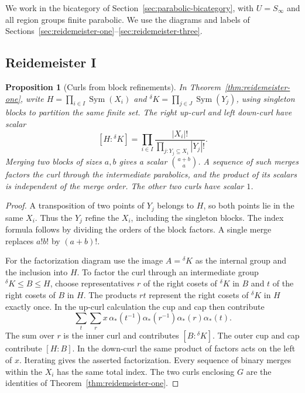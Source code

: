 \documentclass[11pt,a4paper]{article}
\numberwithin{equation}{section}
\newtheorem{proposition}[theorem]{Proposition}
\theoremstyle{definition}
\newcommand{\cg}[2]{{}^{#1}\!#2}
\begin{document}
We work in the bicategory of Section~\ref{sec:parabolic-bicategory},
with \(U=S_\infty\) and all region groups finite parabolic. We use the
diagrams and labels of
Sections~\ref{sec:reidemeister-one}--\ref{sec:reidemeister-three}.

\subsection{Reidemeister I}

\begin{proposition}[Curls from block refinements]\label{prop:parabolic-curls}
In Theorem~\ref{thm:reidemeister-one}, write
\(H=\prod_{i\in I}\operatorname{Sym}(X_i)\) and
\(\cg{\delta}{K}=\prod_{j\in J}\operatorname{Sym}(Y_j)\), using
singleton blocks to partition the same finite set. The right up-curl
and left down-curl have scalar
\[
 [H:\cg{\delta}{K}]
 =\prod_{i\in I}\frac{|X_i|!}{\prod_{j:Y_j\subseteq X_i}|Y_j|!}.
\]
Merging two blocks of sizes \(a,b\) gives a scalar
\(\binom{a+b}{a}\). A sequence of such merges factors the curl through
the intermediate parabolics, and the product of its scalars is
independent of the merge order. The other two curls have scalar \(1\).
\end{proposition}

\begin{proof}
A transposition of two points of \(Y_j\) belongs to \(H\), so both
points lie in the same \(X_i\). Thus the \(Y_j\) refine the \(X_i\),
including the singleton blocks.
The index formula follows by dividing the orders of the block
factors. A single merge replaces \(a!b!\) by \((a+b)!\).

For the factorization diagram use the image \(A=\cg{\delta}{K}\)
as the internal group and the inclusion into \(H\).
To factor the curl through an intermediate group
\(\cg{\delta}{K}\le B\le H\), choose representatives \(r\) of the right
cosets of \(\cg{\delta}{K}\) in \(B\) and \(t\) of the right cosets
of \(B\) in \(H\). The products \(rt\) represent the right cosets
of \(\cg{\delta}{K}\) in \(H\) exactly once. In the up-curl calculation
the cup and cap then contribute
\[
 \sum_t\sum_r x\,\alpha_*(t^{-1})\alpha_*(r^{-1})
                    \alpha_*(r)\alpha_*(t).
\]
The sum over \(r\) is the inner curl and contributes
\([B:\cg{\delta}{K}]\). The outer cup and cap contribute \([H:B]\).
In the down-curl the same product of factors acts on the left of \(x\).
Iterating gives the asserted factorization. Every sequence of binary
merges within the \(X_i\) has the same total index. The two curls
enclosing \(G\) are the identities of
Theorem~\ref{thm:reidemeister-one}.
\end{proof}
\end{document}
